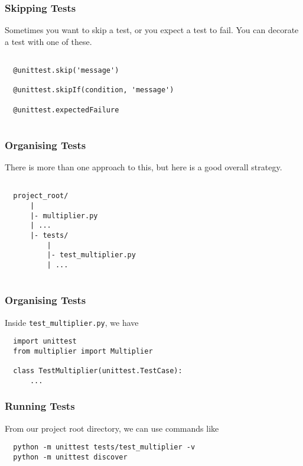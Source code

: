 \documentclass[10pt]{beamer}
\begin{document}
\begin{frame}[fragile]
  \frametitle{Skipping Tests}
  
  
  Sometimes you want to skip a test, or you expect a
  test to fail. You can decorate a test with one of these.
  \begin{verbatim}
  
  @unittest.skip('message')
  
  @unittest.skipIf(condition, 'message')
  
  @unittest.expectedFailure
  
  \end{verbatim} 
    
\end{frame}

\begin{frame}[fragile]
  \frametitle{Organising Tests}
  
  
  There is more than one approach to this, but here is 
  a good overall strategy.
  \begin{verbatim}
  
  project_root/
      |
      |- multiplier.py
      | ...
      |- tests/
          |
          |- test_multiplier.py
          | ...
  
  \end{verbatim} 
    
\end{frame}

\begin{frame}[fragile]
  \frametitle{Organising Tests}
  
  
  Inside \texttt{test\_multiplier.py}, we have
  \begin{verbatim}
  import unittest
  from multiplier import Multiplier
  
  class TestMultiplier(unittest.TestCase):
      ...
  \end{verbatim} 
    
\end{frame}

\begin{frame}[fragile]
  \frametitle{Running Tests}
  
  
  From our project root directory, we can use commands like
  
  \begin{verbatim}
  python -m unittest tests/test_multiplier -v
  python -m unittest discover
  \end{verbatim} 
    
\end{frame}
\end{document}
